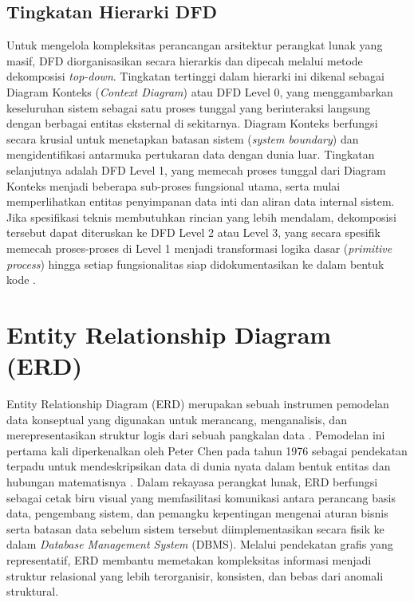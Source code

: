 \documentclass[12pt,a4paper,twoside]{report}
\begin{document}
\subsection{Tingkatan Hierarki DFD}

Untuk mengelola kompleksitas perancangan arsitektur perangkat lunak yang masif, DFD diorganisasikan secara hierarkis dan dipecah melalui metode dekomposisi \textit{top-down}. Tingkatan tertinggi dalam hierarki ini dikenal sebagai Diagram Konteks (\textit{Context Diagram}) atau DFD Level 0, yang menggambarkan keseluruhan sistem sebagai satu proses tunggal yang berinteraksi langsung dengan berbagai entitas eksternal di sekitarnya. Diagram Konteks berfungsi secara krusial untuk menetapkan batasan sistem (\textit{system boundary}) dan mengidentifikasi antarmuka pertukaran data dengan dunia luar. Tingkatan selanjutnya adalah DFD Level 1, yang memecah proses tunggal dari Diagram Konteks menjadi beberapa sub-proses fungsional utama, serta mulai memperlihatkan entitas penyimpanan data inti dan aliran data internal sistem. Jika spesifikasi teknis membutuhkan rincian yang lebih mendalam, dekomposisi tersebut dapat diteruskan ke DFD Level 2 atau Level 3, yang secara spesifik memecah proses-proses di Level 1 menjadi transformasi logika dasar (\textit{primitive process}) hingga setiap fungsionalitas siap didokumentasikan ke dalam bentuk kode \cite{kendall2014}.

\section{Entity Relationship Diagram (ERD)}

Entity Relationship Diagram (ERD) merupakan sebuah instrumen pemodelan data konseptual yang digunakan untuk merancang, menganalisis, dan merepresentasikan struktur logis dari sebuah pangkalan data \cite{elmasri2015}. Pemodelan ini pertama kali diperkenalkan oleh Peter Chen pada tahun 1976 sebagai pendekatan terpadu untuk mendeskripsikan data di dunia nyata dalam bentuk entitas dan hubungan matematisnya \cite{chen1976}. Dalam rekayasa perangkat lunak, ERD berfungsi sebagai cetak biru visual yang memfasilitasi komunikasi antara perancang basis data, pengembang sistem, dan pemangku kepentingan mengenai aturan bisnis serta batasan data sebelum sistem tersebut diimplementasikan secara fisik ke dalam \textit{Database Management System} (DBMS). Melalui pendekatan grafis yang representatif, ERD membantu memetakan kompleksitas informasi menjadi struktur relasional yang lebih terorganisir, konsisten, dan bebas dari anomali struktural.
\end{document}
